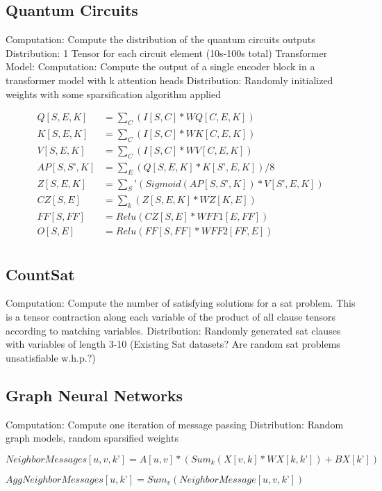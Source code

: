 \documentclass{article}
\begin{document}
\subsection{Quantum Circuits}
	Computation: Compute the distribution of the quantum circuits outputs
	Distribution: 1 Tensor for each circuit element (10s-100s total)
Transformer Model:
	Computation: Compute the output of a single encoder block in a transformer model with k attention heads
	Distribution: Randomly initialized weights with some sparsification algorithm applied
 
 \begin{align*}
Q[S, E, K] &= \sum_C(I[S, C] * WQ[C, E, K])\\
K[S, E, K] &= \sum_C(I[S, C] * WK[C, E, K])\\
V[S, E, K] &= \sum_C(I[S, C] * WV[C, E, K])\\
AP[S, S’, K] &= \sum_E(Q[S, E, K] * K[S’, E, K]) / 8\\
Z[S, E, K] &= \sum_S’(Sigmoid(AP[S,S’,K]) * V[S’, E, K])\\
CZ[S, E] &= \sum_k(Z[S, E, K] * WZ[K,E])\\
FF[S,FF] &= Relu(CZ[S,E] * WFF1[E,FF])\\
O[S,E] &= Relu(FF[S,FF] * WFF2[FF,E])\\
\end{align*}

\subsection{CountSat}
	Computation: Compute the number of satisfying solutions for a sat problem. This is a tensor contraction along each variable of the product of all clause tensors according to matching variables.
	Distribution: Randomly generated sat clauses with variables of length 3-10 (Existing Sat datasets? Are random sat problems unsatisfiable w.h.p.?)

\subsection{Graph Neural Networks}
	Computation: Compute one iteration of message passing
	Distribution: Random graph models, random sparsified weights

$NeighborMessages[u, v, k’] = A[u, v]*(Sum_k(X[v, k]*WX[k, k’]) +BX[k’])  $

$AggNeighborMessages[u, k’] = Sum_v(NeighborMessage[u, v, k’])$
\end{document}
